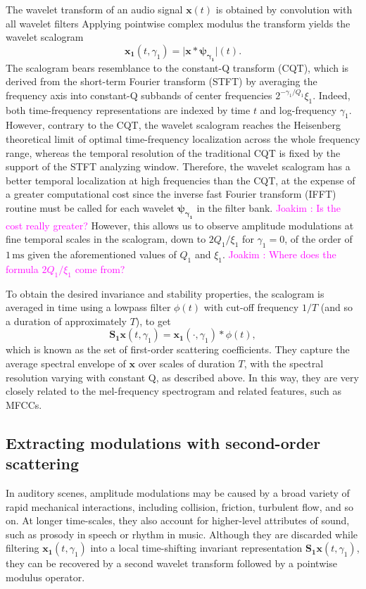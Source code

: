 \documentclass[journal]{IEEEtran}
\newcommand{\ja}[1]{\textcolor{magenta}{Joakim : #1}}
\begin{document}
The wavelet transform of an audio signal
$\boldsymbol{x}(t)$ is obtained by convolution with all wavelet filters
Applying pointwise complex modulus the transform yields
the wavelet scalogram
\begin{equation}
\boldsymbol{x_1}(t, \gamma_1)
= \vert \boldsymbol{x} \ast \boldsymbol{\psi_{\gamma_1}} \vert (t)\mbox{.}
\end{equation}
The scalogram bears resemblance to the constant-Q transform (CQT),
which is derived from the short-term Fourier transform (STFT) by averaging the frequency
axis into constant-Q subbands of center frequencies $2^{-\gamma_1/Q_1}\xi_1$.
Indeed, both time-frequency representations are indexed by time $t$ and log-frequency $\gamma_1$.
However, contrary to the CQT, the wavelet scalogram reaches the Heisenberg
theoretical limit of optimal time-frequency localization across the whole
frequency range, whereas the temporal resolution of the traditional CQT is fixed by the support of the STFT analyzing window. %
Therefore, the wavelet scalogram has a better temporal localization at high
frequencies than the CQT, at the expense of a greater computational cost
since the inverse fast Fourier transform (IFFT) routine must be called for each wavelet $\boldsymbol{\psi_{\gamma_1}}$ in the filter bank. \ja{Is the cost really greater?}
However, this allows us to observe amplitude modulations at fine temporal scales in the scalogram, down to $2Q_1/\xi_1$ for $\gamma_1 = 0$, of the order of $1\,\textrm{ms}$ given the aforementioned values of $Q_1$ and $\xi_1$. \ja{Where does the formula $2Q_1/\xi_1$ come from?}

To obtain the desired invariance and stability properties, the scalogram is averaged in time using a lowpass filter $\phi(t)$ with cut-off frequency $1/T$ (and so a duration of approximately $T$), to get
\begin{equation}
\mathbf{S_1}\boldsymbol{x}(t, \gamma_1) = \boldsymbol{x_1}(\cdot, \gamma_1) \ast \phi(t),
\end{equation}
which is known as the set of first-order scattering coefficients. They capture the average spectral envelope of $\boldsymbol{x}$ over scales of duration $T$, with the spectral resolution varying with constant Q, as described above. In this way, they are very closely related to the mel-frequency spectrogram and related features, such as MFCCs.

\subsection{Extracting modulations with second-order scattering}
In auditory scenes, amplitude modulations may be caused by a broad variety of rapid mechanical interactions, including collision, friction, turbulent flow, and so on.
At longer time-scales, they also account for higher-level attributes of sound, such as prosody in speech or rhythm in music.
Although they are discarded while filtering $\boldsymbol{x_1}(t,\gamma_1)$ into a local time-shifting invariant representation $\mathbf{S_1}\boldsymbol{x}(t,\gamma_1)$, they can be recovered by a second wavelet transform followed by a pointwise modulus operator.
\end{document}

